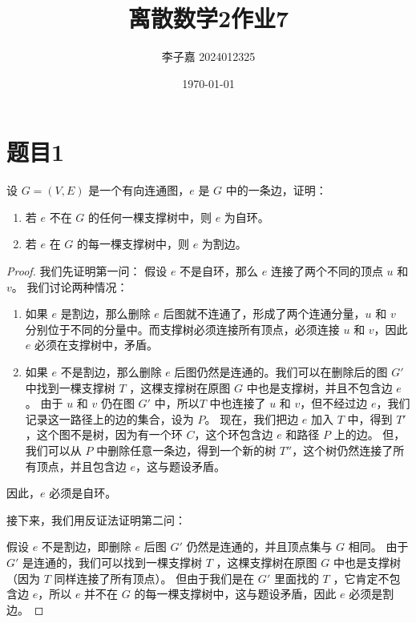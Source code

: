 \documentclass[utf8]{ctexart}
\title{\textbf{离散数学2\quad 作业7}}
\date{\today}
\author{李子嘉 2024012325}
\theoremstyle{mystyle}
\begin{document}
\maketitle

\section*{题目1}

\begin{problembox}
    设 $ G = (V, E) $ 是一个有向连通图，$ e $ 是 $ G $ 中的一条边，证明：
    \begin{enumerate}
        \item 若 $ e $ 不在 $ G $ 的任何一棵支撑树中，则 $ e $ 为自环。
        \item 若 $ e $ 在 $ G $ 的每一棵支撑树中，则 $ e $ 为割边。
    \end{enumerate}
\end{problembox}
\begin{proof}
我们先证明第一问：
假设 $e$ 不是自环，那么 $e$ 连接了两个不同的顶点 $u$ 和 $v$。
我们讨论两种情况：
\begin{enumerate}
    \item 如果 $e$ 是割边，那么删除 $e$ 后图就不连通了，形成了两个连通分量，$u$ 和 $v$ 分别位于不同的分量中。而支撑树必须连接所有顶点，必须连接 $u$ 和 $v$，因此 $e$ 必须在支撑树中，矛盾。
    \item 如果 $e$ 不是割边，那么删除 $e$ 后图仍然是连通的。我们可以在删除后的图 $G'$ 中找到一棵支撑树 $T$ ，这棵支撑树在原图 $G$ 中也是支撑树，并且不包含边 $e$。
    由于 $u$ 和 $v$ 仍在图 $G'$ 中，所以$T$ 中也连接了 $u$ 和 $v$，但不经过边 $e$，我们记录这一路径上的边的集合，设为 $P$。
    现在，我们把边 $e$ 加入 $T$ 中，得到 $T'$，这个图不是树，因为有一个环 $C$，这个环包含边 $e$ 和路径 $P$ 上的边。
    但，我们可以从 $P$ 中删除任意一条边，得到一个新的树 $T''$，这个树仍然连接了所有顶点，并且包含边 $e$，这与题设矛盾。
\end{enumerate}

因此，$e$ 必须是自环。

接下来，我们用反证法证明第二问：

假设 $ e $ 不是割边，即删除 $ e $ 后图 $ G' $ 仍然是连通的，并且顶点集与 $ G $ 相同。
由于 $ G' $ 是连通的，我们可以找到一棵支撑树 $ T $ ，这棵支撑树在原图 $ G $ 中也是支撑树（因为 $ T $ 同样连接了所有顶点）。
但由于我们是在 $G'$ 里面找的 $T$ ，它肯定不包含边 $ e $，所以 $e$ 并不在 $ G $ 的每一棵支撑树中，这与题设矛盾，因此 $ e $ 必须是割边。
\end{proof}
\end{document}
